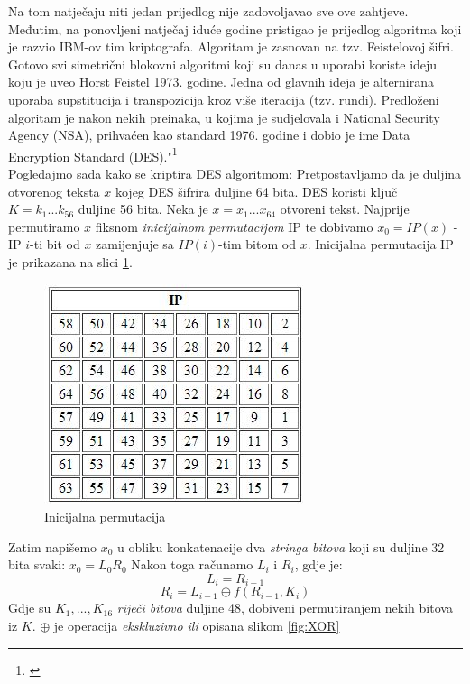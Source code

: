 \documentclass[a4paper,oneside,12pt]{memoir} %
\begin{document}
\begin{spacing}{1.5}
Na tom natječaju niti jedan prijedlog nije zadovoljavao sve ove zahtjeve. Međutim, na ponovljeni natječaj iduće godine pristigao je prijedlog algoritma koji je razvio IBM-ov tim kriptografa. Algoritam je zasnovan na tzv. Feistelovoj šifri. Gotovo svi simetrični blokovni algoritmi koji su danas u uporabi koriste ideju koju je uveo Horst Feistel 1973. godine. Jedna od glavnih ideja je alternirana uporaba supstitucija i transpozicija kroz više iteracija (tzv. rundi).
Predloženi algoritam je nakon nekih preinaka, u kojima je sudjelovala i National Security Agency (NSA), prihvaćen kao standard 1976. godine i dobio je ime Data Encryption Standard (DES)."\footnote{\cite[s. ~?]{duje}}\\
Pogledajmo sada kako se kriptira DES algoritmom:
Pretpostavljamo da je duljina otvorenog teksta $x$ kojeg DES šifrira duljine 64 bita. DES koristi ključ $K=k_1...k_{56}$ duljine 56 bita.
Neka je $x=x_1...x_{64}$ otvoreni tekst. Najprije permutiramo $x$ fiksnom \textit{inicijalnom permutacijom} IP te dobivamo $x_0=IP(x)$ - IP $i$-ti bit od $x$ zamijenjuje sa $IP(i)$-tim bitom od $x$. Inicijalna permutacija IP je prikazana na slici \ref{fig:IP}.

\begin{figure}[h!t]
\centering \includegraphics[scale=1]{IP.jpg}
\caption{Inicijalna permutacija}
\label{fig:IP}
\end{figure}

Zatim napišemo $x_0$ u obliku konkatenacije dva \textit{stringa bitova} koji su duljine 32 bita svaki: $x_0=L_0R_0$ 
Nakon toga računamo $L_i$ i $R_i$, gdje je:
\[L_i=R_{i-1}\]
\[R_i=L_{i-1} \oplus f(R_{i-1}, K_i)\]
Gdje su $K_1,...,K_{16}$ \textit{riječi bitova} duljine 48, dobiveni permutiranjem nekih bitova iz $K$. $\oplus$ je operacija \textit{ekskluzivno ili} opisana slikom \ref{fig:XOR}


\end{spacing}
\end{document}
